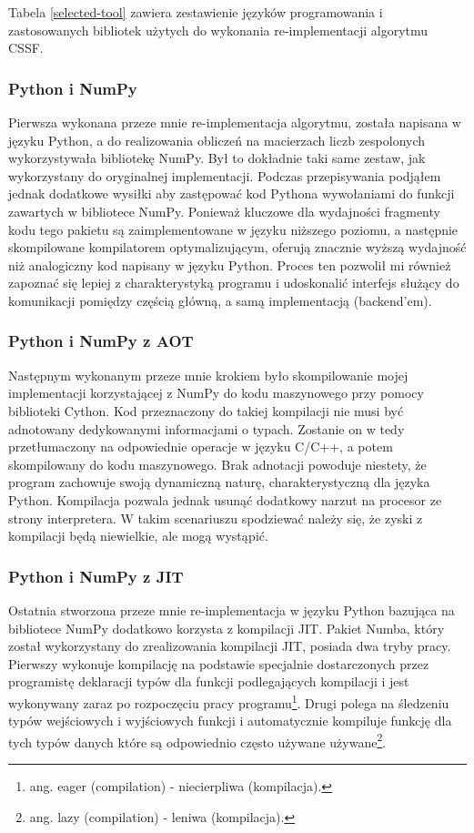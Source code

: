 \documentclass[11pt, a4paper]{article}
\begin{document}
\begin{sloppypar}
    Tabela \ref{selected-tool} zawiera zestawienie języków programowania i zastosowanych
    bibliotek użytych do wykonania re-implementacji algorytmu CSSF.

    \subsubsection{Python i NumPy}
    Pierwsza wykonana przeze mnie re-implementacja algorytmu, została napisana w języku Python,
    a do realizowania obliczeń na macierzach liczb zespolonych wykorzystywała bibliotekę
    NumPy. Był to dokładnie taki same zestaw, jak wykorzystany do oryginalnej
    implementacji. Podczas przepisywania podjąłem jednak dodatkowe wysiłki aby zastępować
    kod Pythona wywołaniami do funkcji zawartych w bibliotece NumPy. Ponieważ kluczowe
    dla wydajności fragmenty kodu tego pakietu są zaimplementowane w języku niższego
    poziomu, a następnie skompilowane kompilatorem optymalizującym, oferują znacznie
    wyższą wydajność niż analogiczny kod napisany w języku Python. Proces ten pozwolił mi
    również zapoznać się lepiej z charakterystyką programu i udoskonalić interfejs służący
    do komunikacji pomiędzy częścią główną, a samą implementacją (backend'em).

    \subsubsection{Python i NumPy z AOT}
    Następnym wykonanym przeze mnie krokiem było skompilowanie mojej implementacji
    korzystającej z NumPy do kodu maszynowego przy pomocy biblioteki Cython. Kod przeznaczony
    do takiej kompilacji nie musi być adnotowany dedykowanymi informacjami o typach.
    Zostanie on w tedy przetłumaczony na odpowiednie operacje w języku C/C++, a potem skompilowany
    do kodu maszynowego. Brak adnotacji powoduje niestety, że program zachowuje swoją dynamiczną
    naturę, charakterystyczną dla języka Python. Kompilacja pozwala jednak usunąć dodatkowy
    narzut na procesor ze strony interpretera. W takim scenariuszu spodziewać należy się,
    że zyski z kompilacji będą niewielkie, ale mogą wystąpić.

    \subsubsection{Python i NumPy z JIT}
    Ostatnia stworzona przeze mnie re-implementacja w języku Python bazująca na
    bibliotece NumPy dodatkowo korzysta z kompilacji JIT. Pakiet Numba, który został
    wykorzystany do zrealizowania kompilacji JIT, posiada dwa tryby pracy. Pierwszy
    wykonuje kompilację na podstawie specjalnie dostarczonych przez programistę
    deklaracji typów dla funkcji podlegających kompilacji i jest wykonywany zaraz po
    rozpoczęciu pracy programu\footnote{ang. eager (compilation) - niecierpliwa (kompilacja).}.
    Drugi polega na śledzeniu typów wejściowych i wyjściowych funkcji i automatycznie kompiluje
    funkcję dla tych typów danych które są odpowiednio często używane używane\footnote{ang.
    lazy (compilation) - leniwa (kompilacja).}.


\end{sloppypar}
\end{document}
